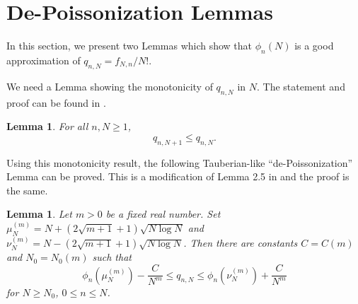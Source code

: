\documentclass{amsart}
\newtheorem{lem}[thm]{Lemma}
\theoremstyle{definition}
\theoremstyle{remark}
\numberwithin{equation}{section}
\begin{document}

\bigskip
\section{{\bf De-Poissonization Lemmas}}
\label{s- dep}

In this section, we present two Lemmas which show that $\phi_n(N)$ is 
a good approximation of $q_{n,N}=f_{N,n}/N!$.

We need a Lemma showing the monotonicity of $q_{n,N}$ in $N$.
The statement and proof can be found in \cite{Johan}.
\begin{lem}\label{lem-dep1}
   For all $n,N\geq 1$, 
\begin{equation*}
  q_{n,N+1} \le q_{n,N}.
\end{equation*}
\end{lem}

Using this monotonicity result, 
the following Tauberian-like ``de-Poissonization'' Lemma can be proved.
This is a modification of Lemma 2.5 in \cite{Johan} and 
the proof is the same.
\begin{lem}\label{lem-dep2}
   Let $m>0$ be a fixed real number. 
   Set $\mu_N^{(m)}=N+(2\sqrt{m+1}+1)\sqrt{N\log N}$
and $\nu_N^{(m)}=N-(2\sqrt{m+1}+1)\sqrt{N\log N}$.
Then there are constants $C=C(m)$ and $N_0=N_0(m)$ such that 
\begin{equation*}
   \phi_n(\mu_N^{(m)})-\frac{C}{N^m} \le q_{n,N}
\le \phi_n(\nu_N^{(m)})+\frac{C}{N^m}
\end{equation*}
for $N\geq N_0$, $0\le n\le N$.
\end{lem}
\end{document}
